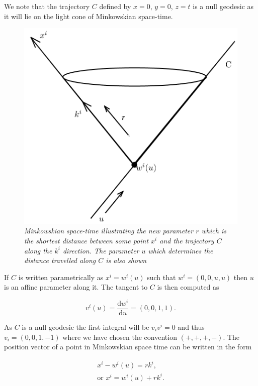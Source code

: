\noindent We note that the trajectory $C$  defined by $x = 0$, $y = 0$, $z = t$ is a null geodesic as it will lie on the light cone of Minkowskian space-time. 

\begin{figure}[h!]
\begin{center}
\caption{\textit{Minkowskian space-time illustrating the new parameter $r$ which is the shortest distance between some point $x^i$ and the trajectory $C$ along the $k^i$ direction. The parameter $u$ which determines the distance travelled along $C$ is also shown}}
\label{Reparameterization_Figure_Unit_Vector}
\includegraphics[scale=0.8]{figs/2_1.png}
\end{center}
\end{figure}

\noindent If $C$ is written parametrically as $x^i = w^i (u)$ such that $w^i = (0,0,u,u)$ then $u$ is an affine parameter along it. The tangent to $C$ is then computed as

\begin{equation*} 
v^i (u) = \frac{\mathrm{d} w^i}{\mathrm{d}u} = (0,0,1,1).
\end{equation*} 

\noindent As $C$ is a null geodesic the first integral will be $v_i v^i = 0$ and thus $v_i = (0,0,1,-1)$ where we have chosen the convention $(+,+,+,-)$. The position vector of a point in Minkowskian space time can be written in the form

\begin{eqnarray*}
x^i - w^i (u) = r k^i, \\
\text{or } x^i = w^i(u) + r k^i. 
\end{eqnarray*}

